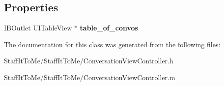 \subsection*{\-Properties}
\begin{DoxyCompactItemize}
\item 
\hypertarget{interface_conversation_view_controller_a95399df15f7895b78bf09f23b8567706}{
\-I\-B\-Outlet \-U\-I\-Table\-View $\ast$ {\bfseries table\-\_\-of\-\_\-convos}}
\label{interface_conversation_view_controller_a95399df15f7895b78bf09f23b8567706}

\end{DoxyCompactItemize}


\-The documentation for this class was generated from the following files\-:\begin{DoxyCompactItemize}
\item 
\-Staff\-It\-To\-Me/\-Staff\-It\-To\-Me/\-Conversation\-View\-Controller.\-h\item 
\-Staff\-It\-To\-Me/\-Staff\-It\-To\-Me/\-Conversation\-View\-Controller.\-m\end{DoxyCompactItemize}
